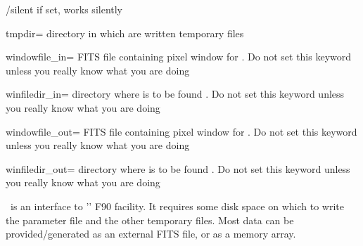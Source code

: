 \begin{keywords}
\begin{kwlist}{}
\item[/silent]     if set, works silently

\item[tmpdir=]       directory in which are written temporary files 

 \item[windowfile\_in=]  %
    FITS file containing pixel window for 
        .
      Do not set this keyword unless you really know what you are doing

  \item[winfiledir\_in=] %
     directory where  is to be found 
        .
      Do not set this keyword unless you really know what you are doing

 \item[windowfile\_out=]  %
    FITS file containing pixel window for 
        .
      Do not set this keyword unless you really know what you are doing

  \item[winfiledir\_out=] %
     directory where  is to be found 
        .
      Do not set this keyword unless you really know what you are doing

  \end{kwlist}
\end{keywords}  

\begin{codedescription}
{\thedocid\ is an interface to '' F90 facility. It
requires some disk space on which to write the parameter file and the other
temporary files. Most data can be provided/generated as an external FITS
file, or as a memory array.}
\end{codedescription}



